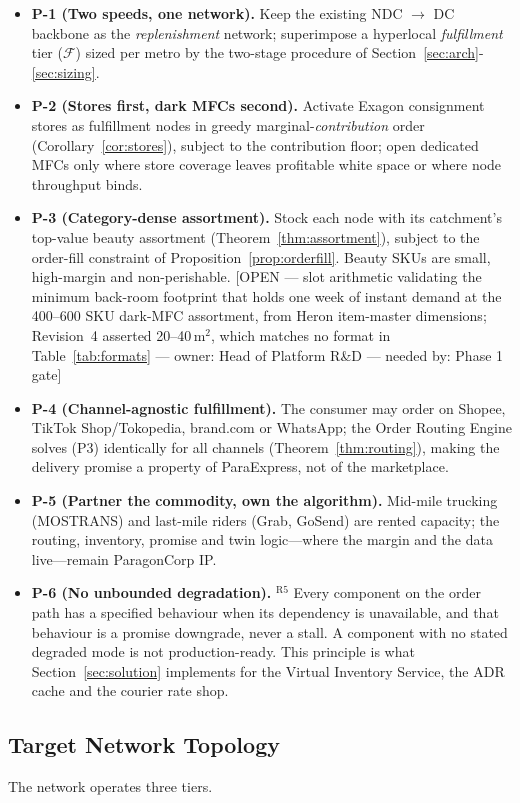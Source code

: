 \documentclass[10pt,twocolumn,letterpaper]{article}
\theoremstyle{definition}
\newcommand{\OPEN}[3]{{\color{openred}\footnotesize\textsf{[OPEN --- #1 --- owner: #2 --- needed by: #3]}}}
\begin{document}
\begin{itemize}
\item \textbf{P-1 (Two speeds, one network).} Keep the existing NDC $\to$ DC backbone as the \emph{replenishment} network; superimpose a hyperlocal \emph{fulfillment} tier ($\mathcal{F}$) sized per metro by the two-stage procedure of Section~\ref{sec:arch}-\ref{sec:sizing}.
\item \textbf{P-2 (Stores first, dark MFCs second).} Activate Exagon consignment stores as fulfillment nodes in greedy marginal-\emph{contribution} order (Corollary~\ref{cor:stores}), subject to the contribution floor; open dedicated MFCs only where store coverage leaves profitable white space or where node throughput binds.
\item \textbf{P-3 (Category-dense assortment).} Stock each node with its catchment's top-value beauty assortment (Theorem~\ref{thm:assortment}), subject to the order-fill constraint of Proposition~\ref{prop:orderfill}. Beauty SKUs are small, high-margin and non-perishable. \OPEN{slot arithmetic validating the minimum back-room footprint that holds one week of instant demand at the 400--600 SKU dark-MFC assortment, from Heron item-master dimensions; Revision~4 asserted 20--40\,m$^2$, which matches no format in Table~\ref{tab:formats}}{Head of Platform R\&D}{Phase 1 gate}
\item \textbf{P-4 (Channel-agnostic fulfillment).} The consumer may order on Shopee, TikTok Shop/Tokopedia, brand.com or WhatsApp; the Order Routing Engine solves (P3) identically for all channels (Theorem~\ref{thm:routing}), making the delivery promise a property of ParaExpress, not of the marketplace.
\item \textbf{P-5 (Partner the commodity, own the algorithm).} Mid-mile trucking (MOSTRANS) and last-mile riders (Grab, GoSend) are rented capacity; the routing, inventory, promise and twin logic---where the margin and the data live---remain ParagonCorp IP.
\item \textbf{P-6 (No unbounded degradation).} $^{\mathrm{R5}}$ Every component on the order path has a specified behaviour when its dependency is unavailable, and that behaviour is a promise downgrade, never a stall. A component with no stated degraded mode is not production-ready. This principle is what Section~\ref{sec:solution} implements for the Virtual Inventory Service, the ADR cache and the courier rate shop.
\end{itemize}

\subsection{Target Network Topology}
The network operates three tiers.
\end{document}
